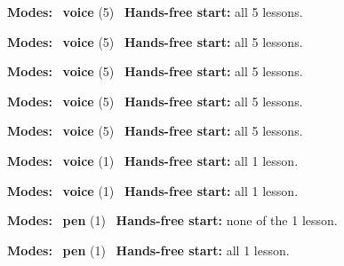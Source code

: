 \expandafter\def\csname hlchaptermodality330\endcsname{%
  {\small\noindent
    \textbf{Modes:} \hlvoicesign{}~\textbf{voice} (5)\quad
    \hlvoicesign{}~\textbf{Hands-free start:} all 5 lessons.%
    \par}\medskip
}

\expandafter\def\csname hlchaptermodality331\endcsname{%
  {\small\noindent
    \textbf{Modes:} \hlvoicesign{}~\textbf{voice} (5)\quad
    \hlvoicesign{}~\textbf{Hands-free start:} all 5 lessons.%
    \par}\medskip
}

\expandafter\def\csname hlchaptermodality332\endcsname{%
  {\small\noindent
    \textbf{Modes:} \hlvoicesign{}~\textbf{voice} (5)\quad
    \hlvoicesign{}~\textbf{Hands-free start:} all 5 lessons.%
    \par}\medskip
}

\expandafter\def\csname hlchaptermodality333\endcsname{%
  {\small\noindent
    \textbf{Modes:} \hlvoicesign{}~\textbf{voice} (5)\quad
    \hlvoicesign{}~\textbf{Hands-free start:} all 5 lessons.%
    \par}\medskip
}

\expandafter\def\csname hlchaptermodality334\endcsname{%
  {\small\noindent
    \textbf{Modes:} \hlvoicesign{}~\textbf{voice} (5)\quad
    \hlvoicesign{}~\textbf{Hands-free start:} all 5 lessons.%
    \par}\medskip
}

\expandafter\def\csname hlchaptermodality335\endcsname{%
  {\small\noindent
    \textbf{Modes:} \hlvoicesign{}~\textbf{voice} (1)\quad
    \hlvoicesign{}~\textbf{Hands-free start:} all 1 lesson.%
    \par}\medskip
}

\expandafter\def\csname hlchaptermodality336\endcsname{%
  {\small\noindent
    \textbf{Modes:} \hlvoicesign{}~\textbf{voice} (1)\quad
    \hlvoicesign{}~\textbf{Hands-free start:} all 1 lesson.%
    \par}\medskip
}

\expandafter\def\csname hlchaptermodality337\endcsname{%
  {\small\noindent
    \textbf{Modes:} \hlpensign{}~\textbf{pen} (1)\quad
    \hlvoicesign{}~\textbf{Hands-free start:} none of the 1 lesson.%
    \par}\medskip
}

\expandafter\def\csname hlchaptermodality338\endcsname{%
  {\small\noindent
    \textbf{Modes:} \hlpensign{}~\textbf{pen} (1)\quad
    \hlvoicesign{}~\textbf{Hands-free start:} all 1 lesson.%
    \par}\medskip
}

